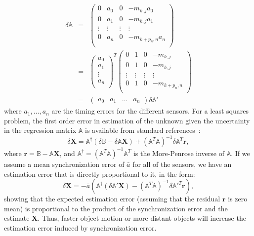 \begin{eqnarray}
\mathbb{\delta A}&=&\begin{pmatrix}
               0 & a_0 & 0 &-m_{k,j}a_0 \\
               0 & a_1 & 0 & -m_{k,j}a_1 \\
               \vdots & \vdots & \vdots & \vdots \\
               0 & a_n & 0 & -m_{k+p_n,n}a_n \\
             \end{pmatrix}\label{eqn:ALSError}\\
&=&\begin{pmatrix}
               a_0 \\
               a_1 \\
               \vdots \\
               a_n \\
             \end{pmatrix}^T\begin{pmatrix}
               0 & 1 & 0 &-m_{k,j} \\
               0 & 1 & 0 & -m_{k,j} \\
               \vdots & \vdots & \vdots & \vdots \\
               0 & 1 & 0 & -m_{k+p_n,n} \\
             \end{pmatrix}\label{eqn:ALSError1}\\
&=&\begin{pmatrix}
               a_0 &
               a_1 &
               \hdots &
               a_n
             \end{pmatrix}\delta\mathbb{A'}
\end{eqnarray}
where $a_1,\ldots,a_n$ are the timing errors for the different sensors. For a least squares problem, the first order error in estimation of the unknown given the uncertainty in the regression matrix $\mathbb{A}$ is available from standard references~\cite{BJORK}:
\begin{equation}
\delta \mathbf{X}=\mathbb{A}^\dag\left(\delta \mathbb{B}-\delta\mathbb{A}\mathbf{X}\right)+\left(\mathbb{A}^T\mathbb{A}\right)^{-1}\delta\mathbb{A}^T\mathbf{r},
\end{equation}
where $\mathbf{r}=\mathbb{B}-\mathbb{A}\mathbf{X}$, and $\mathbb{A}^\dag=\left(\mathbb{A}^T\mathbb{A}\right)^{-1}\mathbb{A}^T$ is the More-Penrose inverse of $\mathbb{A}$. If we assume a mean synchronization error of $\bar{a}$ for all of the sensors, we have an estimation error that is directly proportional to it, in the form:
\begin{equation}
\delta \mathbf{X}=-\bar{a}\left(\mathbb{A}^\dag\left(\delta\mathbb{A'}\mathbf{X}\right)-\left(\mathbb{A}^T\mathbb{A}\right)^{-1}\delta\mathbb{A'}^T\mathbf{r}\right),
\end{equation}
 showing that the expected estimation error (assuming that the residual $\mathbf{r}$ is zero mean) is proportional to the product of the synchronization error and the estimate $\mathbf{X}$. Thus, faster object motion or more distant objects will increase the estimation error induced by synchronization error.
